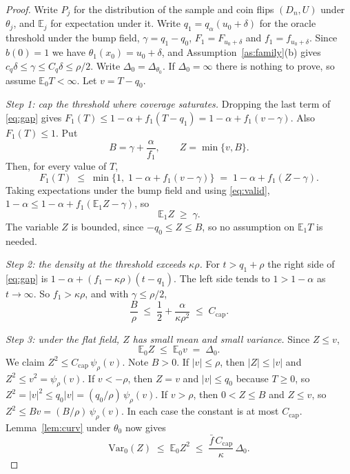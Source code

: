 \documentclass[11pt]{article}
\theoremstyle{definition}
\theoremstyle{remark}
\newcommand{\E}{\mathbb{E}}
\newcommand{\Var}{\mathrm{Var}}
\begin{document}
\begin{proof}
Write $P_j$ for the distribution of the sample and coin flips $(D_n,U)$ under $\theta_j$,
and $\E_j$ for expectation under it. Write $q_1=q_\alpha(u_0+\delta)$ for the oracle
threshold under the bump field, $\gamma=q_1-q_0$, $F_1=F_{u_0+\delta}$ and
$f_1=f_{u_0+\delta}$. Since $b(0)=1$ we have $\theta_1(x_0)=u_0+\delta$, and
Assumption~\ref{as:family}(b) gives $c_q\delta\le\gamma\le C_q\delta\le\rho/2$. Write
$\Delta_0=\Delta_{\theta_0}$. If $\Delta_0=\infty$ there is nothing to prove, so assume
$\E_0T<\infty$. Let $v=T-q_0$.

\emph{Step 1: cap the threshold where coverage saturates.} Dropping the last term of
\eqref{eq:gap} gives $F_1(T)\le1-\alpha+f_1(T-q_1)=1-\alpha+f_1(v-\gamma)$. Also
$F_1(T)\le1$. Put
\[
  B=\gamma+\frac{\alpha}{f_1},\qquad Z=\min\{v,B\}.
\]
Then, for every value of $T$,
\[
  F_1(T)\;\le\;\min\big\{1,\;1-\alpha+f_1(v-\gamma)\big\}\;=\;1-\alpha+f_1(Z-\gamma).
\]
Taking expectations under the bump field and using \eqref{eq:valid},
$1-\alpha\le1-\alpha+f_1(\E_1Z-\gamma)$, so
\begin{equation}\label{eq:e1}
  \E_1Z\;\ge\;\gamma .
\end{equation}
The variable $Z$ is bounded, since $-q_0\le Z\le B$, so no assumption on $\E_1T$ is needed.

\emph{Step 2: the density at the threshold exceeds $\kappa\rho$.} For $t>q_1+\rho$ the
right side of \eqref{eq:gap} is $1-\alpha+(f_1-\kappa\rho)(t-q_1)$. The left side tends to
$1>1-\alpha$ as $t\to\infty$. So $f_1>\kappa\rho$, and with $\gamma\le\rho/2$,
\[
  \frac{B}{\rho}\;\le\;\frac12+\frac{\alpha}{\kappa\rho^2}\;\le\;C_{\mathrm{cap}}.
\]

\emph{Step 3: under the flat field, $Z$ has small mean and small variance.} Since
$Z\le v$,
\begin{equation}\label{eq:e0}
  \E_0Z\;\le\;\E_0v\;=\;\Delta_0 .
\end{equation}
We claim $Z^2\le C_{\mathrm{cap}}\,\psi_\rho(v)$. Note $B>0$. If $|v|\le\rho$, then
$|Z|\le|v|$ and $Z^2\le v^2=\psi_\rho(v)$. If $v<-\rho$, then $Z=v$ and $|v|\le q_0$
because $T\ge0$, so $Z^2=|v|^2\le q_0|v|=(q_0/\rho)\,\psi_\rho(v)$. If $v>\rho$, then
$0<Z\le B$ and $Z\le v$, so $Z^2\le Bv=(B/\rho)\,\psi_\rho(v)$. In each case the constant
is at most $C_{\mathrm{cap}}$. Lemma~\ref{lem:curv} under $\theta_0$ now gives
\begin{equation}\label{eq:var}
  \Var_0(Z)\;\le\;\E_0Z^2\;\le\;\frac{\bar f\,C_{\mathrm{cap}}}{\kappa}\,\Delta_0 .
\end{equation}


\end{proof}
\end{document}
